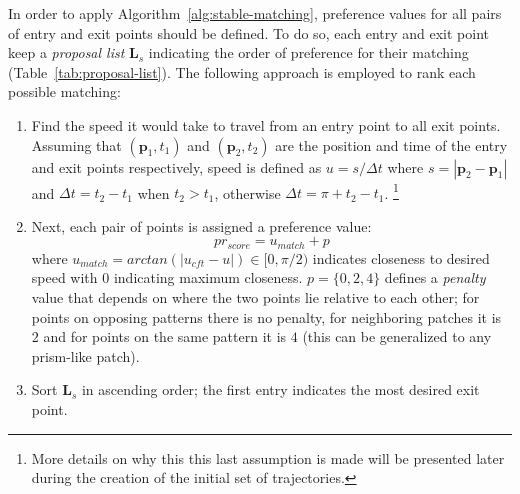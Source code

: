 In order to apply Algorithm~\ref{alg:stable-matching}, preference values for all pairs of entry and exit points should be defined.
To do so, each entry and exit point keep a \emph{proposal list} $\mathbf{L}_s$ indicating the order of preference for their matching (Table~\ref{tab:proposal-list}).
The following approach is employed to rank each possible matching:
\begin{enumerate}
  \item Find the speed it would take to travel from an entry point to all exit points.
  Assuming that $(\mathbf{p}_1, t_1)$ and $(\mathbf{p}_2,t_2)$ are the position and time of the entry and exit points respectively, speed is defined as $u = s / {\Delta}t$ where $s=|\mathbf{p}_2-\mathbf{p}_1|$ and ${\Delta}t = t_2 - t_1$ when $t_2 > t_1$, otherwise ${\Delta}t=\pi + t_2 - t_1$.
  \footnote{More details on why this this last assumption is made will be presented later during the creation of the initial set of trajectories.}
  \item %
  Next, each pair of points is assigned a preference value:
  \begin{equation}
  	pr_{score} = u_{match} + p
  	\label{eqn:objective_function}
  \end{equation}
  where
  		$u_{match} = arctan(|u_{cft} - u|) \in [0, \pi / 2)$ indicates closeness to desired speed with $0$ indicating maximum closeness. 
    	$p = \{0, 2, 4\}$ defines a \emph{penalty} value that depends on where the two points lie relative to each other; for points on opposing patterns there is no penalty, for neighboring patches it is $2$ and for points on the same pattern it is $4$ (this can be generalized to any prism-like patch). 

  \item Sort $\mathbf{L}_s$ in ascending order; the first entry indicates the most desired exit point.
\end{enumerate}
 

